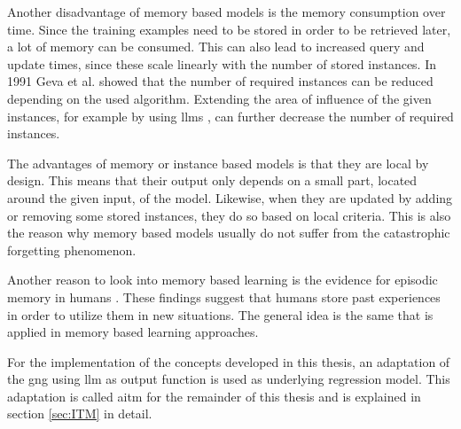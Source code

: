 Another disadvantage of memory based models is the memory consumption over time. Since the training examples need to be stored in order to be retrieved later, a lot of memory can be consumed. This can also lead to increased query and update times, since these scale linearly with the number of stored instances. In 1991 Geva et al. \cite{protReduction} showed that the number of required instances can be reduced depending on the used algorithm. Extending the area of influence of the given instances, for example by using \glspl{llm} \cite{LLM}, can further decrease the number of required instances.

The advantages of memory or instance based models is that they are local by design. This means that their output only depends on a small part, located around the given input, of the model. Likewise, when they are updated by adding or removing some stored instances, they do so based on local criteria. This is also the reason why memory based models usually do not suffer from the catastrophic forgetting phenomenon.

Another reason to look into memory based learning is the evidence for episodic memory in humans \cite{tulving2002episodic}. These findings suggest that humans store past experiences in order to utilize them in new situations. The general idea is the same that is applied in memory based learning approaches.

For the implementation of the concepts developed in this thesis, an adaptation of the \gls{gng} using \gls{llm} as output function is used as underlying regression model. This adaptation is called \gls{aitm} for the remainder of this thesis and is explained in section \ref{sec:ITM} in detail.

%
%
%

